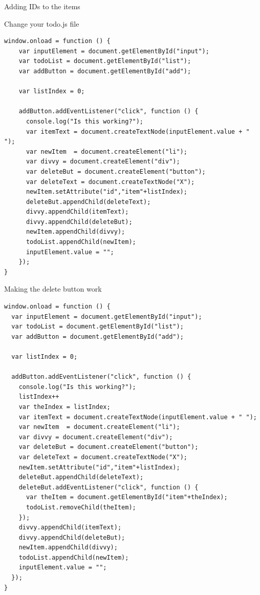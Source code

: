 \documentclass[notes]{beamer}
\begin{document}
\begin{frame}[fragile]{Adding IDs to the items}
  \begin{block}{Change your todo.js file}
    \begin{verbatim}
window.onload = function () {
    var inputElement = document.getElementById("input");
    var todoList = document.getElementById("list");
    var addButton = document.getElementById("add");

    var listIndex = 0;
    
    addButton.addEventListener("click", function () {
      console.log("Is this working?");
      var itemText = document.createTextNode(inputElement.value + " ");
      var newItem  = document.createElement("li");
      var divvy = document.createElement("div");
      var deleteBut = document.createElement("button");
      var deleteText = document.createTextNode("X");
      newItem.setAttribute("id","item"+listIndex);
      deleteBut.appendChild(deleteText);
      divvy.appendChild(itemText);
      divvy.appendChild(deleteBut);
      newItem.appendChild(divvy);
      todoList.appendChild(newItem);
      inputElement.value = "";
    });
}   
    \end{verbatim}
  \end{block}
\end{frame}

\begin{frame}[fragile]{Making the delete button work}
    \begin{verbatim}
window.onload = function () {
  var inputElement = document.getElementById("input");
  var todoList = document.getElementById("list");
  var addButton = document.getElementById("add");
  
  var listIndex = 0;
    
  addButton.addEventListener("click", function () {
    console.log("Is this working?");
    listIndex++
    var theIndex = listIndex;
    var itemText = document.createTextNode(inputElement.value + " ");
    var newItem  = document.createElement("li");
    var divvy = document.createElement("div");
    var deleteBut = document.createElement("button");
    var deleteText = document.createTextNode("X");
    newItem.setAttribute("id","item"+listIndex);
    deleteBut.appendChild(deleteText);
    deleteBut.addEventListener("click", function () {
      var theItem = document.getElementById("item"+theIndex);
      todoList.removeChild(theItem);
    });	
    divvy.appendChild(itemText);
    divvy.appendChild(deleteBut);	
    newItem.appendChild(divvy);
    todoList.appendChild(newItem);
    inputElement.value = "";
  });
}
    \end{verbatim}
\end{frame}
\end{document}
